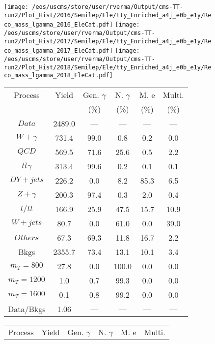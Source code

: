 \begin{figure}
\centering
\texttt{[image: /eos/uscms/store/user/rverma/Output/cms-TT-run2/Plot\_Hist/2016/Semilep/Ele/tty\_Enriched\_a4j\_e0b\_e1y/Reco\_mass\_lgamma\_2016\_EleCat.pdf]}
\texttt{[image: /eos/uscms/store/user/rverma/Output/cms-TT-run2/Plot\_Hist/2017/Semilep/Ele/tty\_Enriched\_a4j\_e0b\_e1y/Reco\_mass\_lgamma\_2017\_EleCat.pdf]}
\texttt{[image: /eos/uscms/store/user/rverma/Output/cms-TT-run2/Plot\_Hist/2018/Semilep/Ele/tty\_Enriched\_a4j\_e0b\_e1y/Reco\_mass\_lgamma\_2018\_EleCat.pdf]}
\begin{minipage}[c]{0.32\textwidth}
\centering
\tiny{
\begin{tabular}{cccccc}
\hline
Process & Yield & Gen. $\gamma$ & N. $\gamma$ & M. e & Multi. \\
 &  & (\%) & (\%) & (\%) & (\%)  \\
\hline
                                                                      $ Data $ &  2489.0 &  --- &  --- &  --- &  ---\\
$ W+\gamma $ &  731.4 &  99.0 &  0.8 &  0.2 &  0.0\\
$ QCD $ &  569.5 &  71.6 &  25.6 &  0.5 &  2.2\\
$ t\bar{t}\gamma $ &  313.4 &  99.6 &  0.2 &  0.1 &  0.1\\
$ DY+jets $ &  226.2 &  0.0 &  8.2 &  85.3 &  6.5\\
$ Z+\gamma $ &  200.3 &  97.4 &  0.3 &  2.0 &  0.4\\
$ t/t\bar{t} $ &  166.9 &  25.9 &  47.5 &  15.7 &  10.9\\
$ W+jets $ &  80.7 &  0.0 &  61.0 &  0.0 &  39.0\\
$ Others $ &  67.3 &  69.3 &  11.8 &  16.7 &  2.2\\
Bkgs &  2355.7 &  73.4 &  13.1 &  10.1 &  3.4\\
$ m_{T} = 800 $ &  27.8 &  0.0 &  100.0 &  0.0 &  0.0\\
$ m_{T} = 1200 $ &  1.0 &  0.7 &  99.3 &  0.0 &  0.0\\
$ m_{T} = 1600 $ &  0.1 &  0.8 &  99.2 &  0.0 &  0.0\\
Data/Bkgs &  1.06 &  --- &  --- &  --- &  ---\\
\hline
\end{tabular}
}
\end{minipage}
\begin{minipage}[c]{0.32\textwidth}
\centering
\tiny{
\begin{tabular}{cccccc}
\hline
Process & Yield & Gen. $\gamma$ & N. $\gamma$ & M. e & Multi. \\

\end{tabular}}
\end{minipage}
\end{figure}
